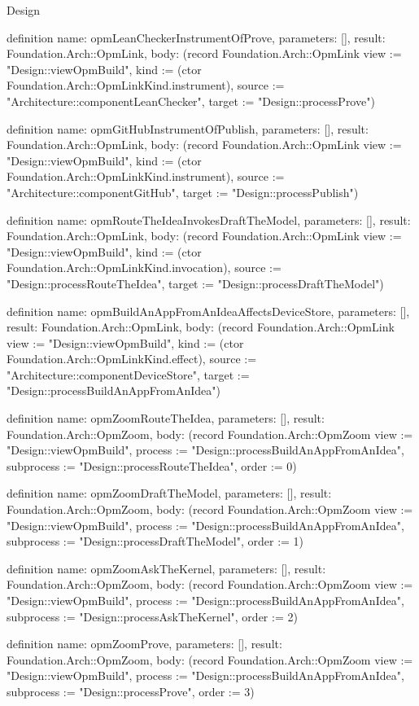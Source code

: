 \begin{lexlean}{Design}
\begin{semanticmodule}
definition{
  name: opmLeanCheckerInstrumentOfProve,
  parameters: [],
  result: Foundation.Arch::OpmLink,
  body: (record Foundation.Arch::OpmLink {view := "Design::viewOpmBuild", kind := (ctor Foundation.Arch::OpmLinkKind.instrument), source := "Architecture::componentLeanChecker", target := "Design::processProve"})
}

definition{
  name: opmGitHubInstrumentOfPublish,
  parameters: [],
  result: Foundation.Arch::OpmLink,
  body: (record Foundation.Arch::OpmLink {view := "Design::viewOpmBuild", kind := (ctor Foundation.Arch::OpmLinkKind.instrument), source := "Architecture::componentGitHub", target := "Design::processPublish"})
}

definition{
  name: opmRouteTheIdeaInvokesDraftTheModel,
  parameters: [],
  result: Foundation.Arch::OpmLink,
  body: (record Foundation.Arch::OpmLink {view := "Design::viewOpmBuild", kind := (ctor Foundation.Arch::OpmLinkKind.invocation), source := "Design::processRouteTheIdea", target := "Design::processDraftTheModel"})
}

definition{
  name: opmBuildAnAppFromAnIdeaAffectsDeviceStore,
  parameters: [],
  result: Foundation.Arch::OpmLink,
  body: (record Foundation.Arch::OpmLink {view := "Design::viewOpmBuild", kind := (ctor Foundation.Arch::OpmLinkKind.effect), source := "Architecture::componentDeviceStore", target := "Design::processBuildAnAppFromAnIdea"})
}

definition{
  name: opmZoomRouteTheIdea,
  parameters: [],
  result: Foundation.Arch::OpmZoom,
  body: (record Foundation.Arch::OpmZoom {view := "Design::viewOpmBuild", process := "Design::processBuildAnAppFromAnIdea", subprocess := "Design::processRouteTheIdea", order := 0})
}

definition{
  name: opmZoomDraftTheModel,
  parameters: [],
  result: Foundation.Arch::OpmZoom,
  body: (record Foundation.Arch::OpmZoom {view := "Design::viewOpmBuild", process := "Design::processBuildAnAppFromAnIdea", subprocess := "Design::processDraftTheModel", order := 1})
}

definition{
  name: opmZoomAskTheKernel,
  parameters: [],
  result: Foundation.Arch::OpmZoom,
  body: (record Foundation.Arch::OpmZoom {view := "Design::viewOpmBuild", process := "Design::processBuildAnAppFromAnIdea", subprocess := "Design::processAskTheKernel", order := 2})
}

definition{
  name: opmZoomProve,
  parameters: [],
  result: Foundation.Arch::OpmZoom,
  body: (record Foundation.Arch::OpmZoom {view := "Design::viewOpmBuild", process := "Design::processBuildAnAppFromAnIdea", subprocess := "Design::processProve", order := 3})
}


\end{semanticmodule}
\end{lexlean}
